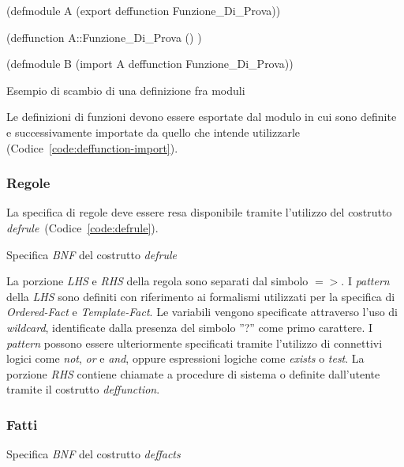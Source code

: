 \begin{program}
\begin{verbatimtab}

(defmodule A
	(export deffunction Funzione_Di_Prova))
	
(deffunction A::Funzione_Di_Prova () )

(defmodule B
	(import A deffunction Funzione_Di_Prova))
\end{verbatimtab}
\caption{Esempio di scambio di una definizione fra moduli}\label{code:deffunction-import}
\end{program}

Le definizioni di funzioni devono essere esportate dal modulo in cui sono definite e successivamente importate da quello che intende utilizzarle (Codice~\ref{code:deffunction-import}).

\subsubsection{Regole}\label{par:linguaggio-regole}
La specifica di regole deve essere resa disponibile tramite l'utilizzo del costrutto \emph{defrule}~(Codice~\ref{code:defrule}).

\begin{program}
\caption{Specifica \emph{BNF} del costrutto \emph{defrule}}\label{code:defrule}
\end{program}

La porzione \emph{LHS} e \emph{RHS} della regola sono separati dal simbolo $=>$. I \emph{pattern} della \emph{LHS} sono definiti con riferimento ai formalismi utilizzati per la specifica di \emph{Ordered-Fact} e \emph{Template-Fact}. Le variabili vengono specificate attraverso l'uso di \emph{wildcard}, identificate dalla presenza del simbolo ''?'' come primo carattere. I \emph{pattern} possono essere ulteriormente specificati tramite l'utilizzo di connettivi logici come \emph{not}, \emph{or} e \emph{and}, oppure espressioni logiche come \emph{exists} o \emph{test}.
La porzione \emph{RHS} contiene chiamate a procedure di sistema o definite dall'utente tramite il costrutto \emph{deffunction}.


\subsubsection{Fatti}\label{par:linguaggio-fatti}

\begin{program}
\caption{Specifica \emph{BNF} del costrutto \emph{deffacts}}\label{code:deffacts}
\end{program}

